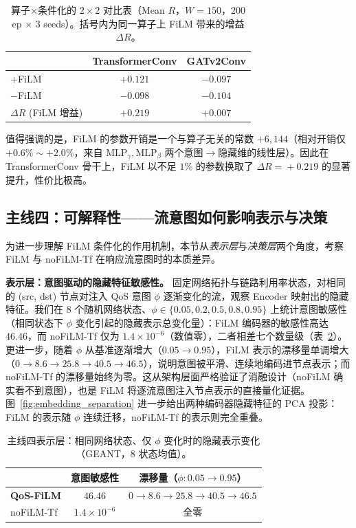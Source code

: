 \begin{table}[t]
\centering
\caption{算子$\times$条件化的 $2\times2$ 对比表（Mean $R$，$W\!=\!150$，200 ep × 3 seeds）。括号内为同一算子上 FiLM 带来的增益 $\Delta R$。}
\label{tab:synergy_2x2}
\setlength{\tabcolsep}{6pt}
\begin{tabular}{lcc}
\toprule
 & TransformerConv & GATv2Conv \\
\midrule
$+$FiLM & $\mathbf{+0.121}$ & $-0.097$ \\
$-$FiLM & $-0.098$ & $-0.104$ \\
\midrule
$\Delta R$ (FiLM 增益) & $\mathbf{+0.219}$ & $+0.007$ \\
\bottomrule
\end{tabular}
\end{table}

值得强调的是，FiLM 的参数开销是一个与算子无关的常数 $+6{,}144$（相对开销仅 $+0.6\%\sim+2.0\%$，来自 $\mathrm{MLP}_\gamma,\mathrm{MLP}_\beta$ 两个意图$\to$隐藏维的线性层）。因此在 TransformerConv 骨干上，FiLM 以不足 $1\%$ 的参数换取了 $\Delta R\!=\!+0.219$ 的显著提升，性价比极高。


\subsection{主线四：可解释性——流意图如何影响表示与决策}
\label{sec:exp:interp}

为进一步理解 FiLM 条件化的作用机制，本节从\emph{表示层}与\emph{决策层}两个角度，考察 FiLM 与 noFiLM-Tf 在响应流意图时的本质差异。

\textbf{表示层：意图驱动的隐藏特征敏感性。} 固定网络拓扑与链路利用率状态，对相同的 (src, dst) 节点对注入 QoS 意图 $\phi$ 逐渐变化的流，观察 Encoder 映射出的隐藏特征。我们在 $8$ 个随机网络状态、$\phi\!\in\!\{0.05,0.2,0.5,0.8,0.95\}$ 上统计意图敏感性（相同状态下 $\phi$ 变化引起的隐藏表示总变化量）：FiLM 编码器的敏感性高达 $46.46$，而 noFiLM-Tf 仅为 $1.4\times10^{-6}$（数值零），二者相差七个数量级（表~\ref{tab:interp_repr}）。更进一步，随着 $\phi$ 从基准逐渐增大（$0.05\!\to\!0.95$），FiLM 表示的漂移量单调增大（$0\!\to\!8.6\!\to\!25.8\!\to\!40.5\!\to\!46.5$），说明意图被平滑、连续地编码进节点表示；而 noFiLM-Tf 的漂移量始终为零。这从架构层面严格验证了消融设计（noFiLM 确实看不到意图），也是 FiLM 将逐流意图注入节点表示的直接量化证据。图~\ref{fig:embedding_separation} 进一步给出两种编码器隐藏特征的 PCA 投影：FiLM 的表示随 $\phi$ 连续迁移，noFiLM-Tf 的表示则完全重叠。

\begin{table}[t]
\centering
\caption{主线四表示层：相同网络状态、仅 $\phi$ 变化时的隐藏表示变化（GEANT，$8$ 状态均值）。}
\label{tab:interp_repr}
\setlength{\tabcolsep}{5pt}
\begin{tabular}{lcc}
\toprule
 & 意图敏感性 & 漂移量（$\phi\!:0.05\!\to\!0.95$） \\
\midrule
\textbf{QoS-FiLM}  & $\mathbf{46.46}$ & $0\to8.6\to25.8\to40.5\to46.5$ \\
noFiLM-Tf         & $1.4\times10^{-6}$ & 全零 \\
\bottomrule
\end{tabular}
\end{table}

